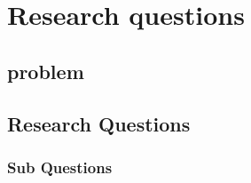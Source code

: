 % 
% 
% 
% 
% 
\newpage
\section{Research questions}



\subsection{problem}



\subsection{Research Questions}



\subsubsection*{Sub Questions}



